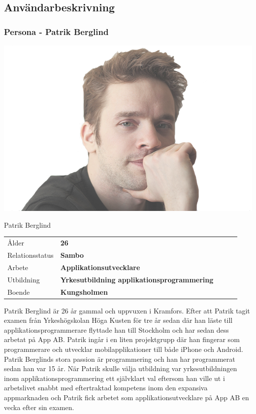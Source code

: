 \subsection{Användarbeskrivning}
\newpage
\subsubsection{Persona - Patrik Berglind}

\vspace{40px}

\includegraphics[scale=0.4]{persona1.png}\\

\vspace{50px}

{\fontsize{1cm}{1em}\selectfont Patrik Berglind}

\vspace{20px}

\begin{tabular}{lllll}
  Ålder & \textbf{26} \\
  Relationsstatus & \textbf{Sambo} \\
  Arbete & \textbf{Applikationsutvecklare}\\
  Utbildning & \textbf{Yrkesutbildning applikationsprogrammering} \\
  Boende & \textbf{Kungsholmen} \\
\end{tabular}

\vspace{20px}

Patrik Berglind är 26 år gammal och uppvuxen i Kramfors. Efter att Patrik tagit examen från Yrkeshögskolan Höga Kusten för tre år sedan där han läste till applikationsprogrammerare flyttade han till Stockholm och har sedan dess arbetat på App AB. Patrik ingår i en liten projektgrupp där han fingerar som programmerare och utvecklar mobilapplikationer till både iPhone och Android. Patrik Berglinds stora passion är programmering och han har programmerat sedan han var 15 år. När Patrik skulle välja utbildning var yrkesutbildningen inom applikationsprogrammering ett självklart val eftersom han ville ut i arbetslivet snabbt med eftertraktad kompetens inom den expansiva appmarknaden och Patrik fick arbetet som applikationsutvecklare på App AB en vecka efter sin examen.

